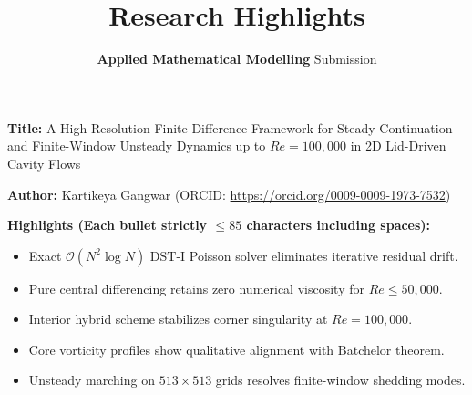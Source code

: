 \documentclass{article}
\title{\textbf{Research Highlights}}
\author{\textbf{Applied Mathematical Modelling} Submission}
\date{}
\begin{document}
\maketitle

\noindent\textbf{Title:} A High-Resolution Finite-Difference Framework for Steady Continuation and Finite-Window Unsteady Dynamics up to $Re = 100{,}000$ in 2D Lid-Driven Cavity Flows

\vspace{0.5em}
\noindent\textbf{Author:} Kartikeya Gangwar (ORCID: \url{https://orcid.org/0009-0009-1973-7532})

\vspace{1em}
\noindent\textbf{Highlights (Each bullet strictly $\le 85$ characters including spaces):}

\begin{itemize}
    \item Exact $\mathcal{O}(N^2 \log N)$ DST-I Poisson solver eliminates iterative residual drift.
    \item Pure central differencing retains zero numerical viscosity for $Re \le 50{,}000$.
    \item Interior hybrid scheme stabilizes corner singularity at $Re = 100{,}000$.
    \item Core vorticity profiles show qualitative alignment with Batchelor theorem.
    \item Unsteady marching on $513 \times 513$ grids resolves finite-window shedding modes.
\end{itemize}
\end{document}

